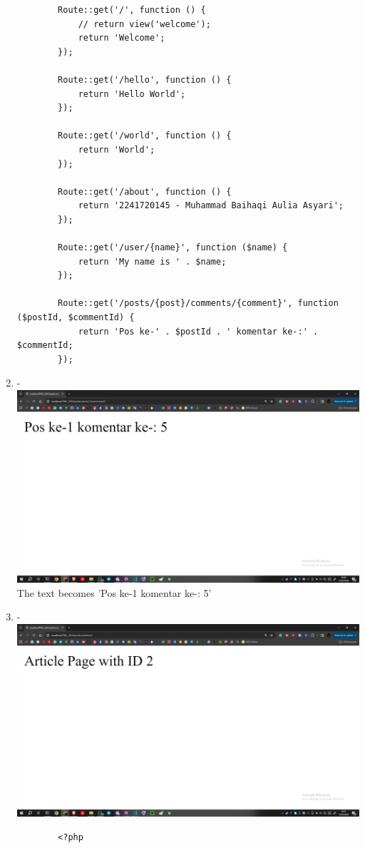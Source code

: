 \documentclass[12pt,titlepage]{article}
\begin{document}
\begin{enumerate}[label=\alph*.]
\begin{verbatim}
        Route::get('/', function () {
            // return view('welcome');
            return 'Welcome';
        });
        
        Route::get('/hello', function () {
            return 'Hello World';
        });
        
        Route::get('/world', function () {
            return 'World';
        }); 
        
        Route::get('/about', function () {
            return '2241720145 - Muhammad Baihaqi Aulia Asyari';
        }); 
        
        Route::get('/user/{name}', function ($name) {
            return 'My name is ' . $name;
        }); 
        
        Route::get('/posts/{post}/comments/{comment}', function ($postId, $commentId) {
            return 'Pos ke-' . $postId . ' komentar ke-:' . $commentId;
        });        
    \end{verbatim}
    \item - \\ \includegraphics[width=.9\textwidth]{images/figures/route parameters e.png} \\ The text becomes 'Pos ke-1 komentar ke-: 5'
    \item - \\ \includegraphics[width=.9\textwidth]{images/figures/route parameters f.png}
    \begin{verbatim}
        <?php


\end{verbatim}
\end{enumerate}
\end{document}
